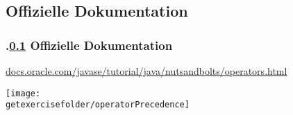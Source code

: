\def\stitle{Offizielle Dokumentation}
\subsection{\stitle}\label{S:Dokumentation}
\begin{frame}[fragile]%
  \frametitle{\kap.\ref{S:Dokumentation} \stitle}%
\textcolor{KITblue}{\url{docs.oracle.com/javase/tutorial/java/nutsandbolts/operators.html}}

\begin{center}
\texttt{[image: \\getexercisefolder/operatorPrecedence]}
\end{center}
\end{frame}

